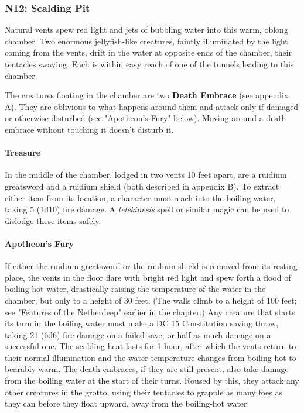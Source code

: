 \documentclass[10pt,a4,twoside,twocolumn,openany,nodeprecatedcode]{dndbook}
\begin{document}
\subsubsection{N12: Scalding Pit}
\begin{DndReadAloud}{}
Natural vents spew red light and jets of bubbling water into this warm, oblong chamber. Two enormous jellyfish-like creatures, faintly illuminated by the light coming from the vents, drift in the water at opposite ends of the chamber, their tentacles swaying. Each is within easy reach of one of the tunnels leading to this chamber.
\end{DndReadAloud}

The creatures floating in the chamber are two \textbf{Death Embrace} (see appendix A). They are oblivious to what happens around them and attack only if damaged or otherwise disturbed (see "Apotheon's Fury" below). Moving around a death embrace without touching it doesn't disturb it.
\paragraph{Treasure}
In the middle of the chamber, lodged in two vents 10 feet apart, are a ruidium greatsword and a ruidium shield (both described in appendix B). To extract either item from its location, a character must reach into the boiling water, taking 5 (1d10) fire damage. A \textit{telekinesis} spell or similar magic can be used to dislodge these items safely.
\paragraph{Apotheon's Fury}
If either the ruidium greatsword or the ruidium shield is removed from its resting place, the vents in the floor flare with bright red light and spew forth a flood of boiling-hot water, drastically raising the temperature of the water in the chamber, but only to a height of 30 feet. (The walls climb to a height of 100 feet; see "Features of the Netherdeep" earlier in the chapter.)
Any creature that starts its turn in the boiling water must make a DC 15 Constitution saving throw, taking 21 (6d6) fire damage on a failed save, or half as much damage on a successful one. The scalding heat lasts for 1 hour, after which the vents return to their normal illumination and the water temperature changes from boiling hot to bearably warm.
The death embraces, if they are still present, also take damage from the boiling water at the start of their turns. Roused by this, they attack any other creatures in the grotto, using their tentacles to grapple as many foes as they can before they float upward, away from the boiling-hot water.
\end{document}
